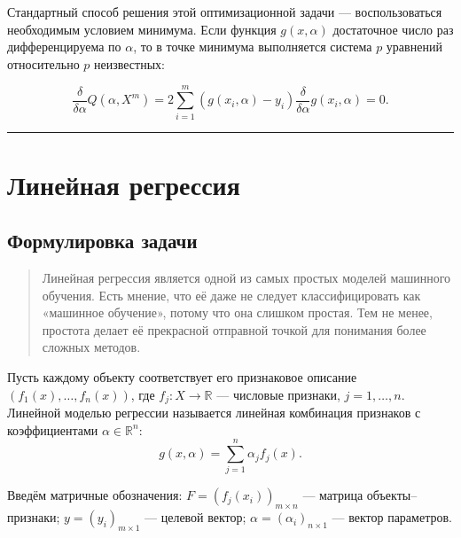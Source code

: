 \documentclass[11pt,a4paper]{article}
\renewcommand{\linethickness}{0.1ex}
\begin{document}
Стандартный способ решения этой оптимизационной задачи ---
воспользоваться необходимым условием минимума. Если функция
\(g(x, \alpha)\) достаточное число раз дифференцируема по \(\alpha\), то
в точке минимума выполняется система \(p\) уравнений относительно \(p\)
неизвестных:

\[ \frac{\delta}{\delta \alpha} Q(\alpha, X^m) = 2 \sum_{i=1}^{m} \left( g(x_i, \alpha) -y_i \right) \frac{\delta}{\delta \alpha} g(x_i, \alpha) = 0. \]

    \begin{center}\rule{0.5\linewidth}{\linethickness}\end{center}

    \hypertarget{ux43bux438ux43dux435ux439ux43dux430ux44f-ux440ux435ux433ux440ux435ux441ux441ux438ux44f}{%
\section{Линейная
регрессия}\label{ux43bux438ux43dux435ux439ux43dux430ux44f-ux440ux435ux433ux440ux435ux441ux441ux438ux44f}}

\hypertarget{ux444ux43eux440ux43cux443ux43bux438ux440ux43eux432ux43aux430-ux437ux430ux434ux430ux447ux438}{%
\subsection{Формулировка
задачи}\label{ux444ux43eux440ux43cux443ux43bux438ux440ux43eux432ux43aux430-ux437ux430ux434ux430ux447ux438}}

\begin{quote}
Линейная регрессия является одной из самых простых моделей машинного
обучения. Есть мнение, что её даже не следует классифицировать как
«машинное обучение», потому что она слишком простая. Тем не менее,
простота делает её прекрасной отправной точкой для понимания более
сложных методов.
\end{quote}

Пусть каждому объекту соответствует его признаковое описание
\(\left( f_1(x), \ldots, f_n(x)\right)\), где
\(f_j: X \rightarrow \mathbb{R}\) --- числовые признаки,
\(j = 1, \ldots , n\). Линейной моделью регрессии называется линейная
комбинация признаков с коэффициентами \(\alpha \in \mathbb{R}^n\):
\[ g(x, \alpha) = \sum_{j=1}^n \alpha_j f_j(x). \]

Введём матричные обозначения:
\(F = \left( f_j(x_i) \right)_{m \times n}\) --- матрица
объекты--признаки; \(y = \left( y_i \right)_{m \times 1}\) --- целевой
вектор; \(\alpha = \left( \alpha_i \right)_{n \times 1}\) --- вектор
параметров.
\end{document}

